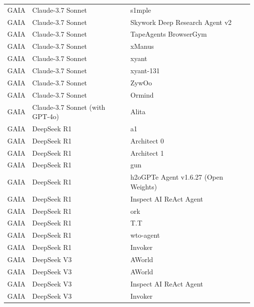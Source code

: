 \begin{longtable}{p{2cm}p{3cm}p{5cm}p{3cm}}
  GAIA & Claude-3.7 Sonnet & s1mple & \cite{mialon_gaia_2023} \\
  GAIA & Claude-3.7 Sonnet & Skywork Deep Research Agent v2 & \cite{mialon_gaia_2023,zhang_agentorchestra_2025} \\
  GAIA & Claude-3.7 Sonnet & TapeAgents BrowserGym & \cite{mialon_gaia_2023,bahdanau_tapeagents_2024} \\
  GAIA & Claude-3.7 Sonnet & xManus & \cite{mialon_gaia_2023,adyuter_adyuterxmanus_2025} \\
  GAIA & Claude-3.7 Sonnet & xyant & \cite{mialon_gaia_2023} \\
  GAIA & Claude-3.7 Sonnet & xyant-131 & \cite{mialon_gaia_2023} \\
  GAIA & Claude-3.7 Sonnet & ZywOo & \cite{mialon_gaia_2023} \\
  GAIA & Claude-3.7 Sonnet  & Ormind & \cite{mialon_gaia_2023,noauthor_ormind_nodate} \\
  GAIA & Claude-3.7 Sonnet (with GPT-4o) & Alita & \cite{mialon_gaia_2023,qiu_alita_2025} \\
  GAIA & DeepSeek R1 & a1 & \cite{mialon_gaia_2023} \\
  GAIA & DeepSeek R1 & Architect 0 & \cite{mialon_gaia_2023} \\
  GAIA & DeepSeek R1 & Architect 1 & \cite{mialon_gaia_2023} \\
  GAIA & DeepSeek R1 & gun & \cite{mialon_gaia_2023} \\
  GAIA & DeepSeek R1 & h2oGPTe Agent v1.6.27 (Open Weights) & \cite{mialon_gaia_2023} \\
  GAIA & DeepSeek R1 & Inspect AI ReAct Agent & \cite{lab_frontier_2025,yao_react_2023,noauthor_react_nodate} \\
  GAIA & DeepSeek R1 & ork & \cite{mialon_gaia_2023} \\
  GAIA & DeepSeek R1 & T.T & \cite{mialon_gaia_2023} \\
  GAIA & DeepSeek R1 & wto-agent & \cite{mialon_gaia_2023} \\
  GAIA & DeepSeek R1  & Invoker & \cite{mialon_gaia_2023} \\
  GAIA & DeepSeek V3 & AWorld & \cite{mialon_gaia_2023,yu_aworld_2025} \\
  GAIA & DeepSeek V3 & AWorld & \cite{mialon_gaia_2023,yu_aworld_2025} \\
  GAIA & DeepSeek V3 & Inspect AI ReAct Agent & \cite{lab_frontier_2025,yao_react_2023,noauthor_react_nodate} \\
  GAIA & DeepSeek V3 & Invoker & \cite{mialon_gaia_2023} \\

\end{longtable}
